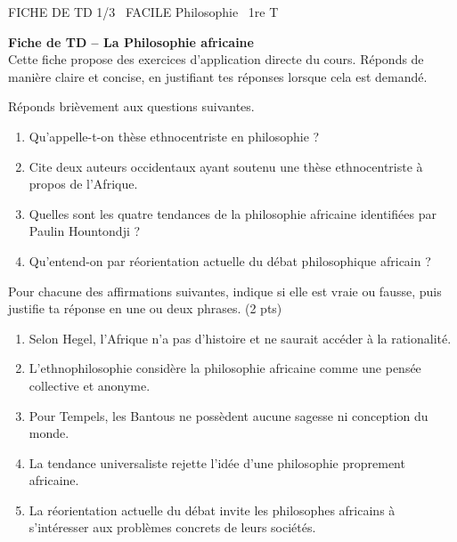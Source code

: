 \documentclass[11pt]{article}
\begin{document}
\begin{tcolorbox}[enhanced,colback=popink,colframe=popink,arc=10pt,boxrule=0pt,left=12pt,right=12pt,top=9pt,bottom=9pt]
{\color{white}\popxbold\small FICHE DE TD 1/3 \textbullet\ FACILE \hfill Philosophie \textbullet\ 1re T\par}
\end{tcolorbox}
\vspace{4pt}
\textbf{Fiche de TD -- La Philosophie africaine}\\
Cette fiche propose des exercices d'application directe du cours. Réponds de manière claire et concise, en justifiant tes réponses lorsque cela est demandé.

\begin{exercice}
Réponds brièvement aux questions suivantes.
\begin{enumerate}
  \item Qu'appelle-t-on \og thèse ethnocentriste \fg{} en philosophie ?
  \item Cite deux auteurs occidentaux ayant soutenu une thèse ethnocentriste à propos de l'Afrique.
  \item Quelles sont les quatre tendances de la philosophie africaine identifiées par Paulin Hountondji ?
  \item Qu'entend-on par \og réorientation actuelle du débat philosophique africain \fg{} ?
\end{enumerate}
\end{exercice}

\begin{exercice}
Pour chacune des affirmations suivantes, indique si elle est vraie ou fausse, puis justifie ta réponse en une ou deux phrases. \hfill (2 pts)
\begin{enumerate}
  \item Selon Hegel, l'Afrique n'a pas d'histoire et ne saurait accéder à la rationalité.
  \item L'ethnophilosophie considère la philosophie africaine comme une pensée collective et anonyme.
  \item Pour Tempels, les Bantous ne possèdent aucune sagesse ni conception du monde.
  \item La tendance universaliste rejette l'idée d'une philosophie proprement africaine.
  \item La réorientation actuelle du débat invite les philosophes africains à s'intéresser aux problèmes concrets de leurs sociétés.
\end{enumerate}
\end{exercice}
\end{document}
